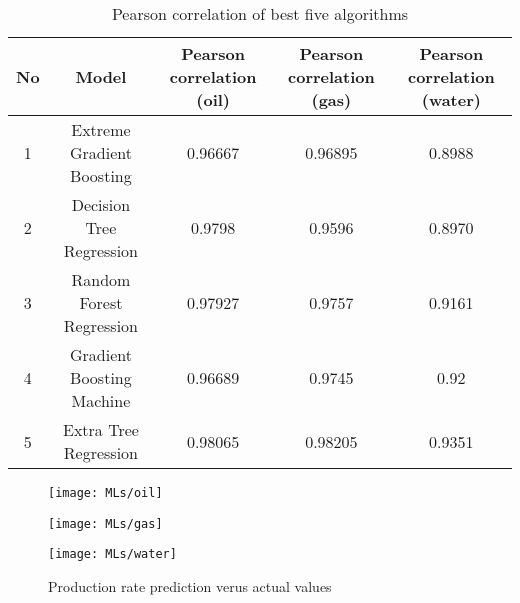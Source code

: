 \documentclass[english]{article}
\makeatletter
\def\maxwidth{\ifdim\Gin@nat@width>\linewidth\linewidth
    \else\Gin@nat@width\fi}
\let\Oldincludegraphics\includegraphics
\renewcommand{\includegraphics}[1]{\Oldincludegraphics[width=.8\maxwidth]{#1}}
\makeatother
\begin{document}
\begin{table}[h]
\caption{Pearson correlation of best five algorithms}
\centering
\begin{tabular}{|c|c|c|c|c|}
\hline
\textbf{No} & \textbf{Model}            & \textbf{Pearson correlation (oil)} & \textbf{Pearson correlation (gas)} & \textbf{Pearson correlation (water)} \\ \hline
1           & Extreme Gradient Boosting & 0.96667                            & 0.96895                            & 0.8988                               \\ \hline
2           & Decision Tree Regression  & 0.9798                             & 0.9596                             & 0.8970                               \\ \hline
3           & Random Forest Regression  & 0.97927                            & 0.9757                             & 0.9161                               \\ \hline
4           & Gradient Boosting Machine & 0.96689                            & 0.9745                             & 0.92                                 \\ \hline
5           & Extra Tree Regression     & 0.98065                            & 0.98205                            & 0.9351                               \\ \hline
\end{tabular}
\end{table}







\begin{figure}[H]
      \begin{minipage}[h]{1.0\linewidth}
         \centering
         \texttt{[image: MLs/oil]}
      \end{minipage}
\vspace{0.00mm}
     \begin{minipage}[h]{1\linewidth}
        \centering
        \texttt{[image: MLs/gas]}
      \end{minipage}
\hspace{0.00mm}
     \begin{minipage}[h]{1\linewidth}
        \centering
        \texttt{[image: MLs/water]}
     \end{minipage}
\caption{Production rate prediction verus actual values}
\label{fig:furt}
\end{figure}
\end{document}
